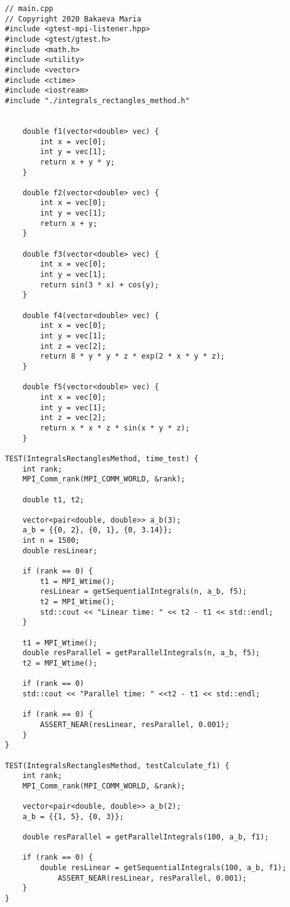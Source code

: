 \documentclass{report}
\begin{document}
\begin{lstlisting}
// main.cpp
// Copyright 2020 Bakaeva Maria
#include <gtest-mpi-listener.hpp>
#include <gtest/gtest.h>
#include <math.h>
#include <utility>
#include <vector>
#include <ctime>
#include <iostream>
#include "./integrals_rectangles_method.h"


    double f1(vector<double> vec) {
        int x = vec[0];
        int y = vec[1];
        return x + y * y;
    }

    double f2(vector<double> vec) {
        int x = vec[0];
        int y = vec[1];
        return x + y;
    }

    double f3(vector<double> vec) {
        int x = vec[0];
        int y = vec[1];
        return sin(3 * x) + cos(y);
    }

    double f4(vector<double> vec) {
        int x = vec[0];
        int y = vec[1];
        int z = vec[2];
        return 8 * y * y * z * exp(2 * x * y * z);
    }

    double f5(vector<double> vec) {
        int x = vec[0];
        int y = vec[1];
        int z = vec[2];
        return x * x * z * sin(x * y * z);
    }

TEST(IntegralsRectanglesMethod, time_test) {
    int rank;
    MPI_Comm_rank(MPI_COMM_WORLD, &rank);

    double t1, t2;

    vector<pair<double, double>> a_b(3);
    a_b = {{0, 2}, {0, 1}, {0, 3.14}};
    int n = 1500;
    double resLinear;

    if (rank == 0) {
        t1 = MPI_Wtime();
        resLinear = getSequentialIntegrals(n, a_b, f5);
        t2 = MPI_Wtime();
        std::cout << "Linear time: " << t2 - t1 << std::endl;
    }

    t1 = MPI_Wtime();
    double resParallel = getParallelIntegrals(n, a_b, f5);
    t2 = MPI_Wtime();

    if (rank == 0)
    std::cout << "Parallel time: " <<t2 - t1 << std::endl;

    if (rank == 0) {
        ASSERT_NEAR(resLinear, resParallel, 0.001);
    }
}

TEST(IntegralsRectanglesMethod, testCalculate_f1) {
    int rank;
    MPI_Comm_rank(MPI_COMM_WORLD, &rank);

    vector<pair<double, double>> a_b(2);
    a_b = {{1, 5}, {0, 3}};

    double resParallel = getParallelIntegrals(100, a_b, f1);

    if (rank == 0) {
        double resLinear = getSequentialIntegrals(100, a_b, f1);
            ASSERT_NEAR(resLinear, resParallel, 0.001);
    }
}


\end{lstlisting}
\end{document}
